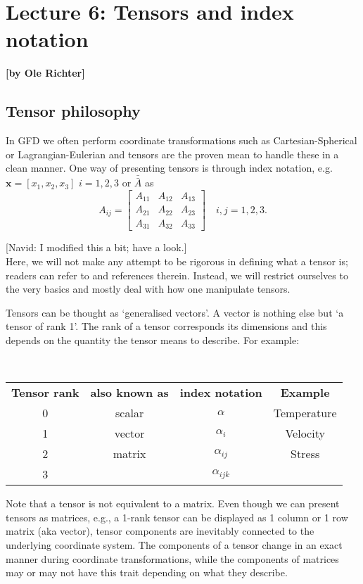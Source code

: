 
\section{Lecture 6: Tensors and index notation} \label{sec:tensors}
\begin{flushright}\textbf{[by Ole Richter]}\end{flushright}

\subsection{Tensor philosophy}
In GFD we often perform coordinate transformations such as Cartesian-Spherical or Lagrangian-Eulerian and tensors are the proven mean to handle these in a clean manner. One way of presenting tensors is through index notation, e.g. $\boldsymbol{x} =[x_1,x_2,x_3]$ $i=1,2,3$ or $\bar{\bar{A}}$ as 
\begin{equation}
    A_{ij} = \begin{bmatrix} 
                A_{11} & A_{12} & A_{13} \\
                A_{21} & A_{22} & A_{23} \\
                A_{31} & A_{32} & A_{33}
                \end{bmatrix} \quad i,j=1,2,3.
\end{equation}

{\color{red} [Navid: I modified this a bit; have a look.]\\

Here, we will not make any attempt to be rigorous in defining what a tensor is; readers can refer to \citet{Griffies2019} and references therein. Instead, we will restrict ourselves to the very basics and mostly deal with how one manipulate tensors.

Tensors can be thought as `generalised vectors'. A vector is nothing else but `a tensor of rank 1'. The rank of a tensor corresponds its dimensions and this depends on the quantity the tensor means to  describe. For example:} \\
\begin{center}
 \begin{tabular}{cccc}
   \textbf{Tensor rank} & \textbf{also known as} & \textbf{index notation} & \textbf{Example} \\
    0  & scalar & $\alpha$ & Temperature \\
    1  & vector & $\alpha_{i}$ & Velocity \\
    2  & matrix & $\alpha_{ij}$ & Stress \\
    3  & & $\alpha_{ijk}$ & \\
\end{tabular}   
\end{center}
Note that a tensor is not equivalent to a matrix. Even though we can present tensors as matrices, e.g., a 1-rank tensor can be displayed as 1 column or 1 row matrix (aka vector), tensor components are inevitably connected to the underlying coordinate system. The components of a tensor change in an exact manner during coordinate transformations, while the components of matrices may or may not have this trait depending on what they describe.

